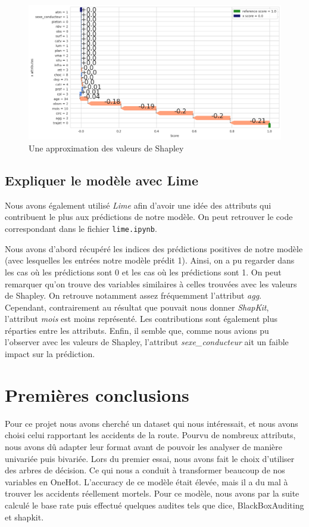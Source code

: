 \documentclass{article}
\begin{document}
    \begin{figure}[h]
        \centering
        \includegraphics[width=\textwidth]{./img/shap1.png}
        \caption{Une approximation des valeurs de Shapley}
        \label{fig:fig_shap}
    \end{figure}

    \subsection{Expliquer le modèle avec Lime}
    Nous avons également utilisé \textit{Lime} afin d'avoir une idée des attributs qui contribuent
    le plus aux prédictions de notre modèle. On peut retrouver le code correspondant dans le fichier 
    \texttt{lime.ipynb}.

    Nous avons d'abord récupéré les indices des prédictions positives de notre modèle (avec lesquelles les 
    entrées notre modèle prédit 1). Ainsi, on a pu regarder dans les cas où les prédictions sont 0 
    et les cas où les prédictions sont 1.
    On peut remarquer qu'on trouve des variables similaires à celles trouvées avec les valeurs de 
    Shapley. On retrouve notamment assez fréquemment l'attribut \textit{agg}.
    Cependant, contrairement au résultat que pouvait nous donner \textit{ShapKit}, l'attribut \textit{mois} est 
    moins représenté. Les contributions sont également plus réparties entre les attributs.
    Enfin, il semble que, comme nous avions pu l'observer avec les valeurs de Shapley, l'attribut 
    \textit{sexe\_conducteur} ait un faible impact sur la prédiction.

    \section{Premières conclusions}
    Pour ce projet nous avons cherché un dataset qui nous intéressait, et nous avons choisi celui rapportant les accidents de la route. Pourvu de 
    nombreux attributs, nous avons dû adapter leur format avant de pouvoir les analyser de manière univariée puis bivariée. Lors du premier essai, 
    nous avons fait le choix d'utiliser des arbres de décision. Ce qui nous a conduit à transformer beaucoup de nos variables en OneHot. L'accuracy 
    de ce modèle était élevée, mais il a du mal à trouver les accidents réellement mortels. Pour ce modèle, nous avons par la suite calculé le base 
    rate puis effectué quelques audites tels que dice, BlackBoxAuditing et shapkit.
\end{document}
